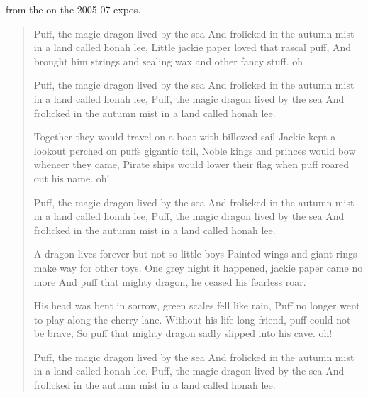  from the  on the 2005-07 expos.

\begin{verse}
\begin{centering}
\vspace{3pt}    

\note Puff, the magic dragon lived by the sea 
\newline And frolicked in the autumn mist in a land called honah lee,
\newline Little jackie paper loved that rascal puff,
\newline And brought him strings and sealing wax and other fancy stuff. oh
\par Puff, the magic dragon lived by the sea
\newline And frolicked in the autumn mist in a land called honah lee,
\newline Puff, the magic dragon lived by the sea
\newline And frolicked in the autumn mist in a land called honah lee.
\par Together they would travel on a boat with billowed sail
\newline Jackie kept a lookout perched on puffs gigantic tail,
\newline Noble kings and princes would bow wheneer they came,
\newline Pirate ships would lower their flag when puff roared out his name. oh!
\par Puff, the magic dragon lived by the sea
\newline And frolicked in the autumn mist in a land called honah lee,
\newline Puff, the magic dragon lived by the sea
\newline And frolicked in the autumn mist in a land called honah lee.
\par A dragon lives forever but not so little boys
\newline Painted wings and giant rings make way for other toys.
\newline One grey night it happened, jackie paper came no more
\newline And puff that mighty dragon, he ceased his fearless roar.
\par His head was bent in sorrow, green scales fell like rain,
\newline Puff no longer went to play along the cherry lane.
\newline Without his life-long friend, puff could not be brave,
\newline So puff that mighty dragon sadly slipped into his cave. oh!
\par Puff, the magic dragon lived by the sea
\newline And frolicked in the autumn mist in a land called honah lee,
\newline Puff, the magic dragon lived by the sea
\newline And frolicked in the autumn mist in a land called honah lee. 


\end{centering}
\end{verse}
